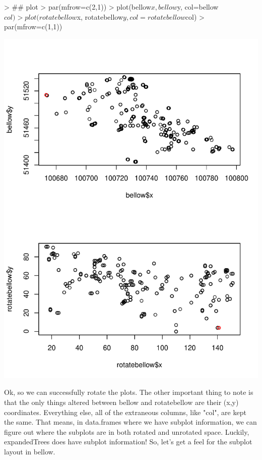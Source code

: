 \documentclass{report}
\begin{document}
\newpage
\begin{Schunk}
\begin{Sinput}
> ## plot
> par(mfrow=c(2,1))
> plot(bellow$x, bellow$y, col=bellow$col)
> plot(rotatebellow$x, rotatebellow$y, col=rotatebellow$col)
> par(mfrow=c(1,1))
\end{Sinput}
\end{Schunk}
\includegraphics{disperseRmanual-013}

Ok, so we can successfully rotate the plots. The other important thing to note is that the only things altered between bellow and rotatebellow are their (x,y) coordinates. Everything else, all of the extraneous columns, like "col", are kept the same. That means, in data.frames where we have subplot information, we can figure out where the subplots are in both rotated and unrotated space. Luckily, expandedTrees does have subplot information! So, let's get a feel for the subplot layout in bellow.
\end{document}
